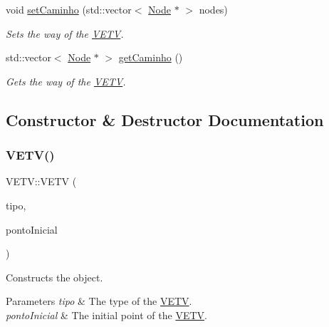 \begin{DoxyCompactItemize}
\mbox{\label{class_v_e_t_v_a70c578d58b4ae180cce2536be2ae3445}} 
void \mbox{\hyperlink{class_v_e_t_v_a70c578d58b4ae180cce2536be2ae3445}{set\+Caminho}} (std\+::vector$<$ \mbox{\hyperlink{class_node}{Node}} $\ast$ $>$ nodes)
\begin{DoxyCompactList}\small\item\em Sets the way of the \mbox{\hyperlink{class_v_e_t_v}{V\+E\+TV}}. \end{DoxyCompactList}\item 
std\+::vector$<$ \mbox{\hyperlink{class_node}{Node}} $\ast$ $>$ \mbox{\hyperlink{class_v_e_t_v_a4a76c35f8b84ec8ad9ac270de1d58e97}{get\+Caminho}} ()
\begin{DoxyCompactList}\small\item\em Gets the way of the \mbox{\hyperlink{class_v_e_t_v}{V\+E\+TV}}. \end{DoxyCompactList}\end{DoxyCompactItemize}


\subsection{Constructor \& Destructor Documentation}
\mbox{\label{class_v_e_t_v_a6608e4fe450f50db107f44012fdeedb3}} 
\subsubsection{\texorpdfstring{VETV()}{VETV()}}
{\footnotesize\ttfamily V\+E\+T\+V\+::\+V\+E\+TV (\begin{DoxyParamCaption}\item[{Tipo}]{tipo,  }\item[{\mbox{\hyperlink{class_node}{Node}} $\ast$}]{ponto\+Inicial }\end{DoxyParamCaption})}



Constructs the object. 


\begin{DoxyParams}{Parameters}
{\em tipo} & The type of the \mbox{\hyperlink{class_v_e_t_v}{V\+E\+TV}}. \\
\hline
{\em ponto\+Inicial} & The initial point of the \mbox{\hyperlink{class_v_e_t_v}{V\+E\+TV}}. \\
\hline
\end{DoxyParams}


